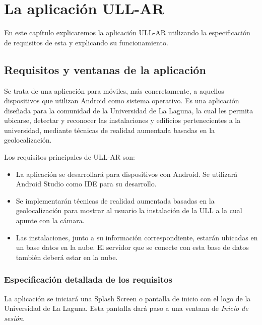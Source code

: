 
%
%
%


\chapter{La aplicación ULL-AR} \label{chap:LaAplicacion} 

En este capítulo explicaremos la aplicación ULL-AR utilizando la especificación de requisitos de esta y explicando su funcionamiento.

\section{Requisitos y ventanas de la aplicación} %


Se trata de una aplicación para móviles, más concretamente, a aquellos dispositivos que utilizan Android como sistema operativo. Es una aplicación diseñada para la comunidad de la Universidad de La Laguna, la cual les permita ubicarse, detectar y reconocer las instalaciones y edificios pertenecientes a la universidad, mediante técnicas de realidad aumentada basadas en la geolocalización.

Los requisitos principales de ULL-AR son:
\begin{itemize}
    \item La aplicación se desarrollará para dispositivos con Android. Se utilizará Android Studio como IDE para su desarrollo.
    \item Se implementarán técnicas de realidad aumentada basadas en la geolocalización para mostrar al usuario la instalación de la ULL a la cual apunte con la cámara.
    \item Las instalaciones, junto a su información correspondiente, estarán ubicadas en un base datos en la nube. El servidor que se conecte con esta base de datos también deberá estar en la nube.
\end{itemize}

\subsection{Especificación detallada de los requisitos} 

La aplicación se iniciará una Splash Screen \cite{URL::SplashScreen} o pantalla de inicio con el logo de la Universidad de La Laguna. Esta pantalla dará paso a una ventana de \textit{Inicio de sesión}.

